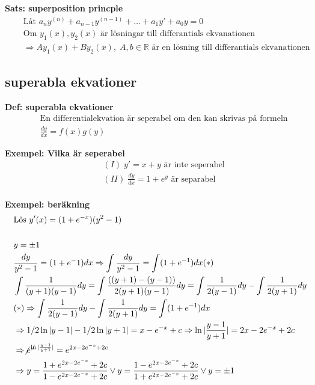 
\textbf{Sats: superposition princple}
\begin{align*}
  &\quad  \text{Låt } a_{n}y^{(n)} + a_{n-1}y^{(n-1)} + \ldots + a_{1}y' + a_{0}y = 0  \\
  &\quad  \text{Om } y_1(x), y_2(x) \text{ är lösningar till differantials ekvanationen} \\
  &\quad  \Rightarrow Ay_1(x) + By_2(x), \; A,b \in \mathbb{R}
  \text{ är en lösning till differantials ekvanationen}
\end{align*}


\newpage


\subsection{superabla ekvationer}
\textbf{Def: superabla ekvationer}
\begin{align*}
  &\quad  \text{En differentialekvation är seperabel om den kan skrivas på formeln} \\
  &\quad  \frac{dy}{dx} = f(x)g(y)
\end{align*}

\textbf{Exempel: Vilka är seperabel}
\begin{align*}
  &\quad  (I) \; y'=x+y \text{ är inte seperabel}  \\
  &\quad  (II) \; \frac{dy}{dx} = 1 + e^y \text{ är separabel} \\ 
\end{align*}

\textbf{Exempel: beräkning}  
\begin{align*}
  &\quad  \text{Lös } y'(x)=(1+e^{-x})(y^2-1) \\
  &\quad  \\
  &\quad  y=\pm1 \\
  &\quad  \frac{dy}{y^2-1}=(1+e^-1)dx  \Rightarrow \int \frac{dy}{y^2-1}= \int (1+e^{-1})dx (*)\\
  &\quad  \int \frac{1}{(y+1)(y-1)}dy = \int \frac{((y+1)-(y-1))}{2(y+1)(y-1)}dy
  = \int \frac{1}{2(y-1)}dy - \int \frac{1}{2(y+1)}dy \\
  &\quad  (*) \Rightarrow  \int \frac{1}{2(y-1)}dy - \int \frac{1}{2(y+1)}dy = \int (1+e^{-1})dx \\
  &\quad  \Rightarrow 1/2 \ln|y-1| - 1/2 \ln|y+1| = x-e^{-x} +c
  \Rightarrow \ln|\frac{y-1}{y+1}| = 2x-2e^{-x}+2c \\
  &\quad  \Rightarrow \not{e}^{\not\ln|\frac{y-1}{y+1}|} = e^{2x-2e^{-x}+2c} \\
  &\quad  \Rightarrow y = \frac{1+e^{2x-2e^{-x}}+2c}{{1-e^{2x-2e^{-x}}+2c}} \lor
  y=\frac{1-e^{2x-2e^{-x}}+2c}{{1+e^{2x-2e^{-x}}+2c}} \lor y=\pm1
\end{align*}


